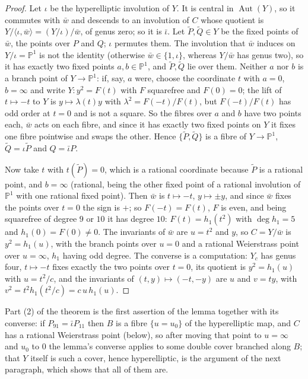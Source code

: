 \documentclass[11pt,reqno]{amsart}
\theoremstyle{plain}
\theoremstyle{definition}
\begin{document}
\begin{proof}
Let $\iota$ be the hyperelliptic involution of $Y$. It is central in $\operatorname{Aut}(Y)$, so it
commutes with $\bar w$ and descends to an involution of $C$ whose quotient is
$Y/\langle\iota,\bar w\rangle=(Y/\iota)/\bar w$, of genus zero; so it is $\bar\iota$. Let $\tilde
P,\tilde Q\in Y$ be the fixed points of $\bar w$, the points over $P$ and $Q$; $\iota$ permutes them.
The involution that $\bar w$ induces on $Y/\iota=\mathbb P^1$ is not the identity (otherwise $\bar w
\in\{1,\iota\}$, whereas $Y/\bar w$ has genus two), so it has exactly two fixed points $a,b\in
\mathbb P^1$, and $\tilde P,\tilde Q$ lie over them. Neither $a$ nor $b$ is a branch point of
$Y\to\mathbb P^1$: if, say, $a$ were, choose the coordinate $t$ with $a=0$, $b=\infty$ and write
$Y\colon y^2=F(t)$ with $F$ squarefree and $F(0)=0$; the lift of $t\mapsto-t$ to $Y$ is
$y\mapsto\lambda(t)y$ with $\lambda^2=F(-t)/F(t)$, but $F(-t)/F(t)$ has odd order at $t=0$ and is
not a square. So the fibres over $a$ and $b$ have two points each, $\bar w$ acts on each fibre, and
since it has exactly two fixed points on $Y$ it fixes one fibre pointwise and swaps the other.
Hence $\{\tilde P,\tilde Q\}$ is a fibre of $Y\to\mathbb P^1$, $\tilde Q=\iota\tilde P$ and
$Q=\bar\iota P$.

Now take $t$ with $t(\tilde P)=0$, which is a rational coordinate because $\tilde P$ is a
rational point, and $b=\infty$ (rational, being the other fixed point of a rational involution of
$\mathbb P^1$ with one rational fixed point). Then $\bar w$ is $t\mapsto-t$, $y\mapsto\pm y$, and
since $\bar w$ fixes the points over $t=0$ the sign is $+$; so $F(-t)=F(t)$, $F$ is even, and being
squarefree of degree $9$ or $10$ it has degree $10$: $F(t)=h_1(t^2)$ with $\deg h_1=5$ and
$h_1(0)=F(0)\neq0$. The invariants of $\bar w$ are $u=t^2$ and $y$, so $C=Y/\bar w$ is $y^2=h_1(u)$,
with the branch points over $u=0$ and a rational Weierstrass point over $u=\infty$, $h_1$ having
odd degree. The converse is a computation: $Y_c$ has genus four, $t\mapsto-t$ fixes exactly the
two points over $t=0$, its quotient is $y^2=h_1(u)$ with $u=t^2/c$, and the invariants of
$(t,y)\mapsto(-t,-y)$ are $u$ and $v=ty$, with $v^2=t^2h_1(t^2/c)=c\,u\,h_1(u)$.
\end{proof}

Part (2) of the theorem is the first assertion of the lemma together with its converse: if $P_{91}=
\bar\iota P_{11}$ then $B$ is a fibre $\{u=u_0\}$ of the hyperelliptic map, and $C$ has a rational
Weierstrass point (below), so after moving that point to $u=\infty$ and $u_0$ to $0$ the lemma's
converse applies to some double cover branched along $B$; that $Y$ itself is such a cover, hence
hyperelliptic, is the argument of the next paragraph, which shows that all of them are.
\end{document}
